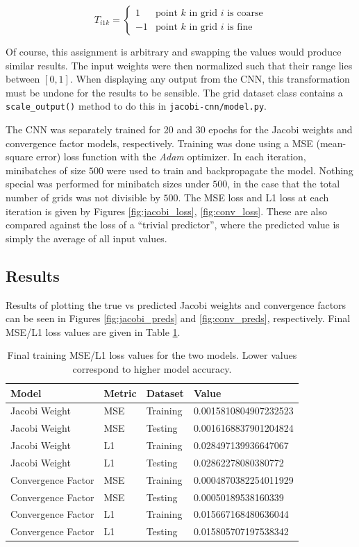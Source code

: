 $$
T_{i1k} = \begin{cases}
1 & \text{point $k$ in grid $i$ is coarse}\\
-1 & \text{point $k$ in grid $i$ is fine}
\end{cases}
$$

Of course, this assignment is arbitrary and swapping the values would produce similar results.  The input weights were then normalized such that their range lies between $\left[0, 1\right]$.  When displaying any output from the CNN, this transformation must be undone for the results to be sensible.  The grid dataset class contains a \texttt{scale\_output()} method to do this in \texttt{jacobi-cnn/model.py}.

The CNN was separately trained for 20 and 30 epochs for the Jacobi weights and convergence factor models, respectively.  Training was done using a MSE (mean-square error) loss function with the \textit{Adam} optimizer.  In each iteration, minibatches of size $500$ were used to train and backpropagate the model.  Nothing special was performed for minibatch sizes under $500$, in the case that the total number of grids was not divisible by $500$.  The MSE loss and L1 loss at each iteration is given by Figures \ref{fig:jacobi_loss}, \ref{fig:conv_loss}.  These are also compared against the loss of a ``trivial predictor'', where the predicted value is simply the average of all input values.

\subsection{Results}

Results of plotting the true vs predicted Jacobi weights and convergence factors can be seen in Figures \ref{fig:jacobi_preds} and \ref{fig:conv_preds}, respectively.  Final MSE/L1 loss values are given in Table \ref{tab:loss}.

\begin{table}[t]
\centering
\begin{tabular}{|l|l|l|l|}
\hline
Model & Metric & Dataset & Value \\

\hline
Jacobi Weight & MSE & Training & 0.0015810804907232523 \\
Jacobi Weight & MSE & Testing & 0.0016168837901204824 \\
Jacobi Weight & L1 & Training & 0.028497139936647067 \\
Jacobi Weight & L1 & Testing & 0.02862278080380772 \\
\hline
Convergence Factor & MSE & Training & 0.0004870382254011929 \\
Convergence Factor & MSE & Testing & 0.00050189538160339 \\
Convergence Factor & L1 & Training & 0.015667168480636044 \\
Convergence Factor & L1 & Testing & 0.015805707197538342 \\
\hline
\end{tabular}
\caption{Final training MSE/L1 loss values for the two models.  Lower values correspond to higher model accuracy.}
\label{tab:loss}
\end{table}


